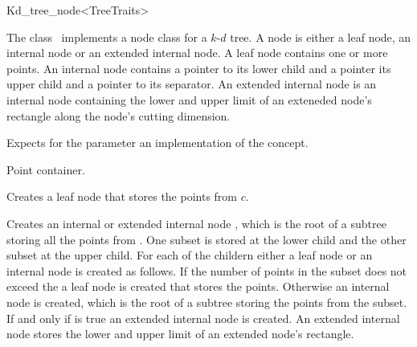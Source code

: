 

\begin{ccRefClass}{Kd_tree_node<TreeTraits>}  %


\ccDefinition
  
The class \ccRefName\ implements a node class for a $k$-$d$ tree. 
A node is either a leaf node, an internal node or an extended internal node.
A leaf node contains one or more points. An internal node contains a pointer
to its lower child and a pointer its upper child and a pointer to its separator.
An extended internal node is an internal node containing the lower and 
upper limit of an exteneded node's rectangle
along the node's cutting dimension.



Expects for the parameter  an implementation
of the 
concept.

\ccTypes


 {Point container.}

\ccCreation
{}  %

{
Creates a leaf node  that stores the points from $c$.
}

{
Creates an internal or extended internal node , which is the root of a subtree 
storing all the points 
from . One subset is stored at the lower child and the other subset at the upper child.
For each of the childern either a leaf node or an internal node is created as follows.
If the number of points in the subset does not exceed the  a leaf node is
created that stores the points. Otherwise an internal node is created, which is the root of
a subtree storing the points from the subset. If and only if  
is true an extended internal node is created. An extended internal node stores 
the lower and upper limit of an extended node's rectangle. 
}


\end{ccRefClass}
